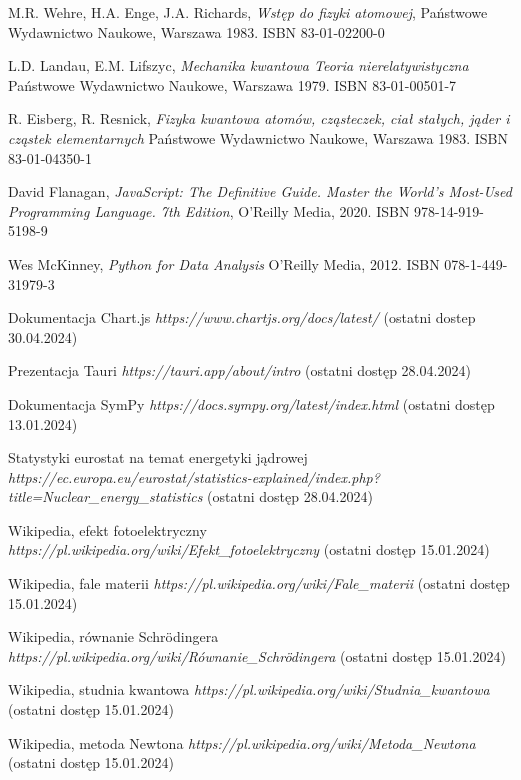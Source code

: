 \documentclass{SGGW-thesis}
\begin{document}
\begin{thebibliography}{9}
	M.R. Wehre, H.A. Enge, J.A. Richards,
	\textit{Wstęp do fizyki atomowej}, 
	Państwowe Wydawnictwo Naukowe, Warszawa 1983. ISBN 83-01-02200-0
	
	L.D. Landau, E.M. Lifszyc,
	\textit{Mechanika kwantowa Teoria nierelatywistyczna}
	Państwowe Wydawnictwo Naukowe, Warszawa 1979. ISBN 83-01-00501-7
	
	R. Eisberg, R. Resnick,
	\textit{Fizyka kwantowa atomów, cząsteczek, ciał stałych, jąder i cząstek elementarnych}
	Państwowe Wydawnictwo Naukowe, Warszawa 1983. ISBN 83-01-04350-1

	David Flanagan, 
	\textit{JavaScript: The Definitive Guide. Master the World's Most-Used Programming Language. 7th Edition}, 
	O'Reilly Media, 2020. ISBN 978-14-919-5198-9
	
	Wes McKinney,
	\textit{Python for Data Analysis}
	O'Reilly Media, 2012. ISBN 078-1-449-31979-3
	
	Dokumentacja Chart.js
	\textit{https://www.chartjs.org/docs/latest/}
	(ostatni dostep 30.04.2024)
	
	Prezentacja Tauri
	\textit{https://tauri.app/about/intro}
	(ostatni dostęp 28.04.2024)
	
	Dokumentacja SymPy
	\textit{https://docs.sympy.org/latest/index.html}
	(ostatni dostęp 13.01.2024)
	
	Statystyki eurostat na temat energetyki jądrowej
	\textit{https://ec.europa.eu/eurostat/statistics-explained/index.php?title=Nuclear\_energy\_statistics}
	(ostatni dostęp 28.04.2024)
	
	Wikipedia, efekt fotoelektryczny 
	\textit{https://pl.wikipedia.org/wiki/Efekt\_fotoelektryczny}
	(ostatni dostęp 15.01.2024)
	
	Wikipedia, fale materii
	\textit{https://pl.wikipedia.org/wiki/Fale\_materii}
	(ostatni dostęp 15.01.2024)
	
	Wikipedia, równanie Schrödingera
	\textit{https://pl.wikipedia.org/wiki/Równanie\_Schrödingera}
	(ostatni dostęp 15.01.2024)
	
	Wikipedia, studnia kwantowa
	\textit{https://pl.wikipedia.org/wiki/Studnia\_kwantowa}
	(ostatni dostęp 15.01.2024)
	
	Wikipedia, metoda Newtona
	\textit{https://pl.wikipedia.org/wiki/Metoda\_Newtona}
	(ostatni dostęp 15.01.2024) 
	

\end{thebibliography}
\end{document}
